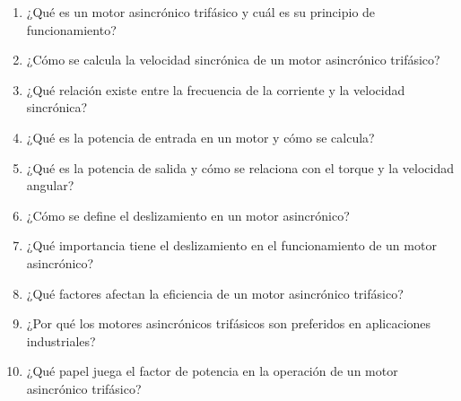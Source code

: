 \documentclass[../main]{subfiles}
\begin{document}
\begin{enumerate}
    \item ¿Qué es un motor asincrónico trifásico y cuál es su principio de funcionamiento?
    \item ¿Cómo se calcula la velocidad sincrónica de un motor asincrónico trifásico?
    \item ¿Qué relación existe entre la frecuencia de la corriente y la velocidad sincrónica?
    \item ¿Qué es la potencia de entrada en un motor y cómo se calcula?
    \item ¿Qué es la potencia de salida y cómo se relaciona con el torque y la velocidad angular?
    \item ¿Cómo se define el deslizamiento en un motor asincrónico?
    \item ¿Qué importancia tiene el deslizamiento en el funcionamiento de un motor asincrónico?
    \item ¿Qué factores afectan la eficiencia de un motor asincrónico trifásico?
    \item ¿Por qué los motores asincrónicos trifásicos son preferidos en aplicaciones industriales?
    \item ¿Qué papel juega el factor de potencia en la operación de un motor asincrónico trifásico?
\end{enumerate}
\end{document}
